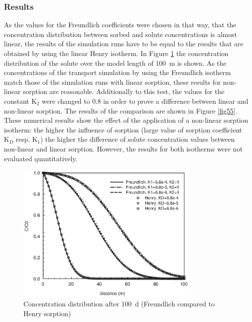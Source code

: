 \subsubsection{Results}

As the values for the Freundlich coefficients were chosen in that way, that the concentration distribution between sorbed and solute concentrations is almost linear, the results of the simulation runs have to be equal to the results that are obtained by using the linear Henry isotherm. In Figure \ref{fig54} the concentration distribution of the solute over the model length of 100~m is shown. As the concentrations of the transport simulation by using the Freundlich isotherm match those of the simulation runs with linear sorption, these results for non-linear sorption are reasonable. Additionally to this test, the values for the constant K$_2$ were changed to 0.8 in order to prove a difference between linear and non-linear sorption. The results of the comparison are shown in Figure \ref{fig55}. These numerical results show the effect of the application of a non-linear sorption isotherm: the higher the influence of sorption (large value of sorption coefficient K$_D$ resp. K$_1$) the higher the difference of solute concentration values between non-linear and linear sorption. However, the results for both isotherms were not evaluated quantitatively.

\begin{figure}[htbp]
\centering
\includegraphics[width=0.8\textwidth]{PART_II/C/fig54.EPS}
\caption{Concentration distribution after 100~d (Freundlich compared to Henry sorption)}
\label{fig54}
\end{figure}

